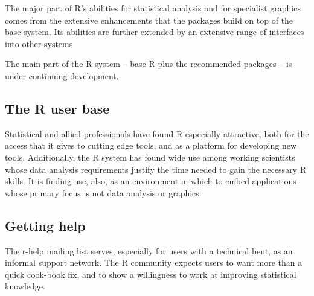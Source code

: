 \documentclass{tufte-book}\usepackage[]{graphicx}\usepackage[]{color}
\begin{document}
The major part of R's abilities for statistical analysis
and for specialist graphics comes from the extensive enhancements that
the packages build on top of the base system.  Its abilities are
further extended by an extensive range of interfaces into
other systems

The main part of the R system -- base R plus the recommended packages
-- is under continuing development.

\subsection*{The R user base}

Statistical and allied professionals have found R
  especially attractive, both for the access that it gives to
  cutting edge tools, and as a platform for developing new tools.
Additionally, the R system has found wide use among working
scientists whose data analysis requirements justify the time
needed to gain the necessary R skills.  It is finding use, also, as
an environment in which to embed applications whose primary focus
is not data analysis or graphics.


\subsection*{Getting help}

\begin{fullwidth}
\end{fullwidth}
\vspace*{8pt}

The r-help mailing list  serves, especially
for users with a technical bent, as an informal support network.  The
R community expects users to want more than a quick cook-book fix, and
to show a willingness to work at improving statistical knowledge.
\end{document}
